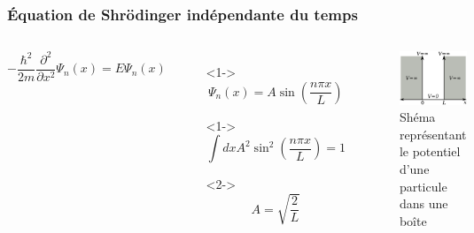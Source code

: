 \documentclass[aspectratio=169]{beamer}
\begin{document}
\begin{frame}
\frametitle{Équation de Shrödinger indépendante du temps}

\begin{columns}

\begin{equation}\tag{4}
-\frac{\hbar^2}{2m}\frac{\partial^2}{\partial x^2}\Psi_n(x)=E\Psi_n(x)
\end{equation} 

\begin{itemize}
\item[]<1-> \begin{equation}\tag{5}
\Psi_n(x)=A\sin(\frac{n\pi x}{L})
\end{equation}  
\item[]<1-> \begin{equation}\tag{6}
\int dx A^2\sin^2(\frac{n\pi x}{L})=1
\end{equation}
\item[]  <2-> \begin{equation}\tag{7}
A=\sqrt{\frac{2}{L}}
\end{equation}
\end{itemize}
\begin{figure}
\includegraphics[scale=0.4]{Pot}
\caption{Shéma représentant le potentiel d'une particule dans une boîte}
\end{figure}
\end{columns}

\end{frame}
\end{document}
